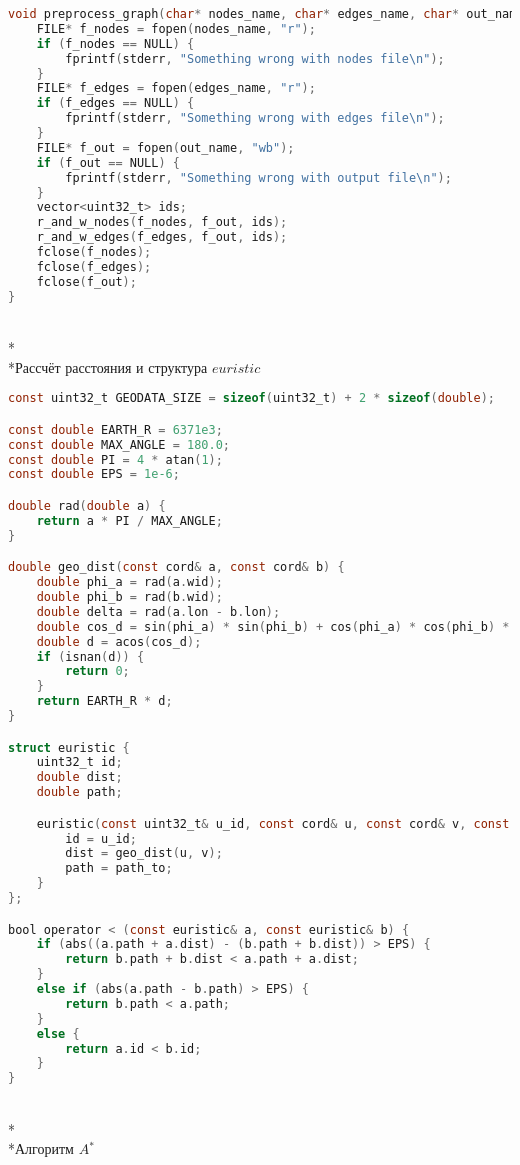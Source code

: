 \begin{lstlisting}[language=C]
void preprocess_graph(char* nodes_name, char* edges_name, char* out_name) {
    FILE* f_nodes = fopen(nodes_name, "r");
    if (f_nodes == NULL) {
        fprintf(stderr, "Something wrong with nodes file\n");
    }
    FILE* f_edges = fopen(edges_name, "r");
    if (f_edges == NULL) {
        fprintf(stderr, "Something wrong with edges file\n");
    }
    FILE* f_out = fopen(out_name, "wb");
    if (f_out == NULL) {
        fprintf(stderr, "Something wrong with output file\n");
    }
    vector<uint32_t> ids;
    r_and_w_nodes(f_nodes, f_out, ids);
    r_and_w_edges(f_edges, f_out, ids);
    fclose(f_nodes);
    fclose(f_edges);
    fclose(f_out);
}
\end{lstlisting}

\\*\\*Рассчёт расстояния и структура $euristic$

\begin{lstlisting}[language=C]
const uint32_t GEODATA_SIZE = sizeof(uint32_t) + 2 * sizeof(double);

const double EARTH_R = 6371e3;
const double MAX_ANGLE = 180.0;
const double PI = 4 * atan(1);
const double EPS = 1e-6;

double rad(double a) {
    return a * PI / MAX_ANGLE;
}

double geo_dist(const cord& a, const cord& b) {
    double phi_a = rad(a.wid);
    double phi_b = rad(b.wid);
    double delta = rad(a.lon - b.lon);
    double cos_d = sin(phi_a) * sin(phi_b) + cos(phi_a) * cos(phi_b) * cos(delta);
    double d = acos(cos_d);
    if (isnan(d)) {
        return 0;
    }
    return EARTH_R * d;
}

struct euristic {
    uint32_t id;
    double dist;
    double path;

    euristic(const uint32_t& u_id, const cord& u, const cord& v, const double& path_to) {
        id = u_id;
        dist = geo_dist(u, v);
        path = path_to;
    }
};

bool operator < (const euristic& a, const euristic& b) {
    if (abs((a.path + a.dist) - (b.path + b.dist)) > EPS) {
        return b.path + b.dist < a.path + a.dist;
    }
    else if (abs(a.path - b.path) > EPS) {
        return b.path < a.path;
    }
    else {
        return a.id < b.id;
    }
}
\end{lstlisting}

\\*\\*Алгоритм $A$$^*$

